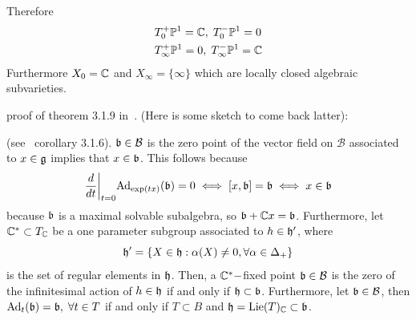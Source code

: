 \begin{itemize}
\begin{center}
    \end{center}
    Therefore 
    \begin{equation}
        \begin{aligned}
            &T_0^+\mathbb{P}^1=\mathbb{C},\; T_0^{-}\mathbb{P}^1 = 0\\
            &T_\infty^+\mathbb{P}^1=0,\; T_\infty^{-}\mathbb{P}^1 = \mathbb{C}
        \end{aligned}
    \end{equation}
    Furthermore $X_0=\mathbb{C}$ and $X_\infty=\{\infty\}$ which are locally closed algebraic subvarieties.\par 

    \TODO proof of theorem 3.1.9 in~\cite{chriss1997representation}. 
    (Here is some sketch to come back latter):


    \begin{remark}
        (see~\cite{chriss1997representation} corollary 3.1.6). $\mathfrak{b}\in\mathcal{B}$ is the zero point 
        of the vector field on $\mathcal{B}$ associated to $x\in\mathfrak{g}$ implies that 
        $x\in\mathfrak{b}$. This follows because 
        \begin{equation}
            \frac{d}{dt}\bigg|_{t=0}\text{Ad}_{\exp(tx)}(\mathfrak{b})=0\iff [x,\mathfrak{b}]=\mathfrak{b}\iff x\in\mathfrak{b}
        \end{equation}
        because $\mathfrak{b}$ is a maximal solvable subalgebra, so $\mathfrak{b}+\mathbb{C} x = \mathfrak{b}$.
        Furthermore,
        let $\mathbb{C}^*\subset T_{\mathbb{C}}$ be a one parameter subgroup associated to $h\in\mathfrak{h}^\prime$, where 
        \begin{equation}
            \mathfrak{h}^\prime =\{X\in \mathfrak{h}: \alpha(X)\neq0,\forall \alpha\in\Delta_+\}
        \end{equation}
        is the set of regular elements in $\mathfrak{h}$. Then, a 
        $\mathbb{C}^*-$fixed point $\mathfrak{b}\in\mathcal{B}$ is the zero of the infinitesimal action of 
        $h\in\mathfrak{h}$ if and only if $\mathfrak{h}\subset\mathfrak{b}$. Furthermore, let 
        $\mathfrak{b}\in\mathcal{B}$, then $\text{Ad}_t(\mathfrak{b})=\mathfrak{b},\;\forall t\in T$ if and only if 
        $T\subset B$ and $\mathfrak{h}=\text{Lie}(T)_{\mathbb{C}}\subset \mathfrak{b}$. 
    \end{remark}
\end{itemize}

